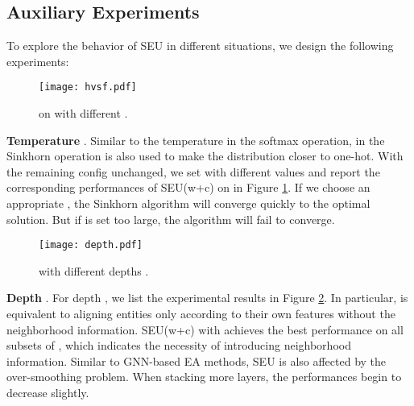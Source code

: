 \documentclass[11pt]{article}
\begin{document}
\subsection{Auxiliary Experiments}
To explore the behavior of SEU in different situations, we design the following experiments:


\begin{figure}[t!]
  \centering
  \texttt{[image: hvsf.pdf]}
  \caption{ on  with different .}\label{fig:hvsp}
\end{figure}


\textbf{Temperature }.
Similar to the temperature  in the softmax operation,  in the Sinkhorn operation is also used to make the distribution closer to one-hot.
With the remaining config unchanged, we set  with different values and report the corresponding performances of SEU(w+c) on  in Figure \ref{fig:hvsp}.
If we choose an appropriate , the Sinkhorn algorithm will converge quickly to the optimal solution.
But if  is set too large, the algorithm will fail to converge.

\begin{figure}[t!]
  \centering
  \texttt{[image: depth.pdf]}
  \caption{ with different depths .}\label{fig:depth}
\end{figure}

\textbf{Depth }.
For depth , we list the experimental results in Figure \ref{fig:depth}.
In particular,  is equivalent to aligning entities only according to their own features without the neighborhood information.
SEU(w+c) with  achieves the best performance on all subsets of , which indicates the necessity of introducing neighborhood information.
Similar to GNN-based EA methods, SEU is also affected by the over-smoothing problem.
When stacking more layers, the performances begin to decrease slightly.


\begin{table}[t]
\centering
{}
\caption{Performances with different types of adjacency matrices .}
\label{table:adj}
\end{table}
\end{document}
